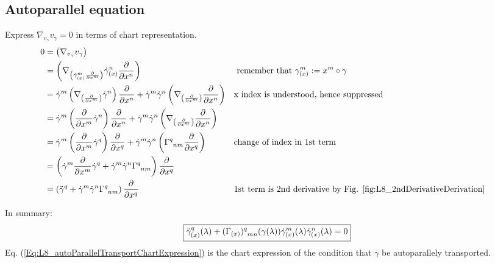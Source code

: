 \subsection{Autoparallel equation}
Express $\nabla_{v_{\gamma}} v_{\gamma} = 0$ in terms of chart representation.
\begin{align*}
0 & = \left(\nabla_{v_{\gamma}} v_{\gamma}\right) \\
& = \left(\nabla_{\left(\dot{\gamma}^m_{(x)} \cibasis{x^m}\right)} \dot{\gamma}^n_{(x)} \cibasis{x^n}\right) && \text{ remember that } \gamma^m_{(x)} := x^m \after \gamma \\
& = \dot{\gamma}^m \left(\nabla_{\left(\cibasis{x^m}\right)} \dot{\gamma}^n\right) \cibasis{x^n} + \dot{\gamma}^m \dot{\gamma}^n \left(\nabla_{\left(\cibasis{x^m}\right)} \cibasis{x^n}\right) && \text{x index is understood, hence suppressed} \\
& = \dot{\gamma}^m \left(\cibasis{x^m} \dot{\gamma}^n\right) \cibasis{x^n} + \dot{\gamma}^m \dot{\gamma}^n \left(\nabla_{\left(\cibasis{x^m}\right)} \cibasis{x^n}\right) && \text{} \\
& = \dot{\gamma}^m \left(\cibasis{x^m} \dot{\gamma}^q\right) \cibasis{x^q} + \dot{\gamma}^m \dot{\gamma}^n \left(\Gamma\indices{^{q}_{nm}} \cibasis{x^q}\right) && \text{change of index in 1st term} \\
& = \left(\dot{\gamma}^m \cibasis{x^m} \dot{\gamma}^q + \dot{\gamma}^m \dot{\gamma}^n \Gamma\indices{^{q}_{nm}}\right) \cibasis{x^q} && \text{} \\
& = \left(\ddot{\gamma}^q + \dot{\gamma}^m \dot{\gamma}^n \Gamma\indices{^{q}_{nm}}\right) \cibasis{x^q} && \text{1st term is 2nd derivative by Fig. \ref{fig:L8_2ndDerivativeDerivation}}
\end{align*}


In summary:
\begin{equation}\label{Eq:L8_autoParallelTransportChartExpression}
\boxed{\ddot{\gamma}^q_{(x)}(\lambda) + (\Gamma_{(x)})\indices{^{q}_{mn}}(\gamma(\lambda)) \dot{\gamma}^m_{(x)}(\lambda) \dot{\gamma}^n_{(x)}(\lambda) = 0}
\end{equation}
Eq. (\ref{Eq:L8_autoParallelTransportChartExpression}) is the chart expression of the condition that $\gamma$ be autoparallely transported.

